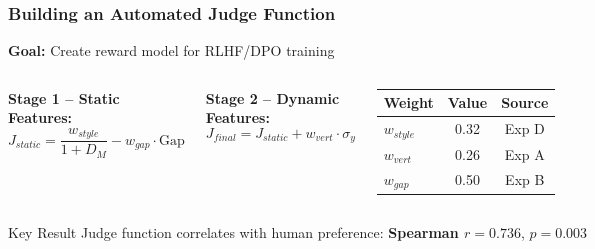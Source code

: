\documentclass{beamer}
\begin{document}
\begin{frame}
\frametitle{Building an Automated Judge Function}

\textbf{Goal:} Create reward model for RLHF/DPO training

\vspace{0.5em}
\begin{columns}
\textbf{Stage 1 -- Static Features:}
$$J_{static} = \frac{w_{style}}{1+D_M} - w_{gap} \cdot \text{Gap}$$

\vspace{0.3em}
\textbf{Stage 2 -- Dynamic Features:}
$$J_{final} = J_{static} + w_{vert} \cdot \sigma_y$$

\begin{table}
\centering
\footnotesize
\begin{tabular}{lcc}
\toprule
\textbf{Weight} & \textbf{Value} & \textbf{Source} \\
\midrule
$w_{style}$ & 0.32 & Exp D \\
$w_{vert}$ & 0.26 & Exp A \\
$w_{gap}$ & 0.50 & Exp B \\
\bottomrule
\end{tabular}
\end{table}
\end{columns}

\vspace{0.5em}
\begin{alertblock}{Key Result}
Judge function correlates with human preference: \textbf{Spearman $r = 0.736$}, $p = 0.003$
\end{alertblock}

\end{frame}
\end{document}
